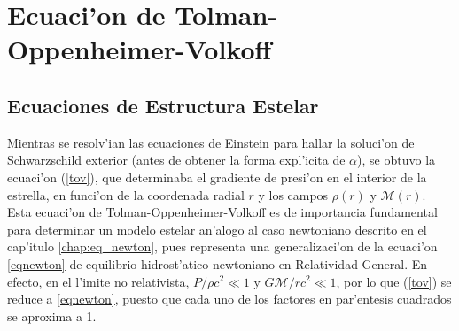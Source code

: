 \section{Ecuaci'on de Tolman-Oppenheimer-Volkoff}

\subsection{Ecuaciones de Estructura Estelar}\label{ecs-estructura-estelar}
Mientras se resolv'ian las ecuaciones de Einstein para hallar la soluci'on de Schwarzschild exterior (antes de obtener la forma expl'icita de $\alpha$), se obtuvo la ecuaci'on (\ref{tov}), que determinaba el gradiente de presi'on en el interior de la estrella, en funci'on de la coordenada radial $r$ y los campos $\rho(r)$ y $\mathcal{M}(r)$. Esta ecuaci'on de Tolman-Oppenheimer-Volkoff es de importancia fundamental para determinar un modelo estelar an'alogo al caso newtoniano descrito en el cap'itulo \ref{chap:eq_newton}, pues representa una generalizaci'on de la ecuaci'on \eqref{eqnewton} de equilibrio hidrost'atico newtoniano en Relatividad General. En efecto, en el l'imite no relativista, $P/\rho c^2\ll1$ y $G\mathcal{M}/rc^2\ll1$, por lo que (\ref{tov}) se reduce a \eqref{eqnewton}, puesto que cada uno de los factores en par'entesis cuadrados se aproxima a 1.

